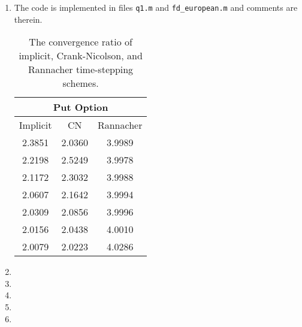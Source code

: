 \documentclass[10pt,english]{article}
\theoremstyle{plain}
\begin{document}
\begin{enumerate}
\item The code is implemented in files \texttt{q1.m} and \texttt{fd\_european.m} and comments are therein.
\begin{table}[t]
\centering
\begin{tabular}{|c|c|c|}
\multicolumn{3}{c}{Put Option}\\
\hline
	Implicit & CN & Rannacher\\
\hline
2.3851 & 2.0360 & 3.9989\\
2.2198 & 2.5249 & 3.9978\\
2.1172 & 2.3032 & 3.9988\\
2.0607 & 2.1642 & 3.9994\\
2.0309 & 2.0856 & 3.9996\\
2.0156 & 2.0438 & 4.0010\\
2.0079 & 2.0223 & 4.0286\\
\hline
\end{tabular}
\caption{The convergence ratio of implicit, Crank-Nicolson, and Rannacher time-stepping schemes.}
\end{table}
\item


\item
\item
\item

\item

\end{enumerate}
\end{document}
